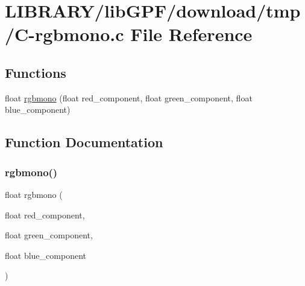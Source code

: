 \hypertarget{C-rgbmono_8c}{}\section{L\+I\+B\+R\+A\+R\+Y/lib\+G\+P\+F/download/tmp/\+C-\/rgbmono.c File Reference}
\label{C-rgbmono_8c}
\subsection*{Functions}
\begin{DoxyCompactItemize}
\item 
float \hyperlink{C-rgbmono_8c_a22b27fb2e3d8d0451aec4fa812dd267a}{rgbmono} (float red\+\_\+component, float green\+\_\+component, float blue\+\_\+component)
\end{DoxyCompactItemize}


\subsection{Function Documentation}
\mbox{\label{C-rgbmono_8c_a22b27fb2e3d8d0451aec4fa812dd267a}} 
\subsubsection{\texorpdfstring{rgbmono()}{rgbmono()}}
{\footnotesize\ttfamily float rgbmono (\begin{DoxyParamCaption}\item[{float}]{red\+\_\+component,  }\item[{float}]{green\+\_\+component,  }\item[{float}]{blue\+\_\+component }\end{DoxyParamCaption})}

